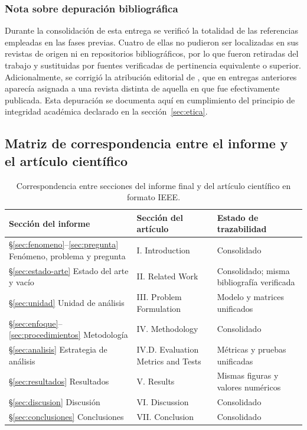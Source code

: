 \subsubsection*{Nota sobre depuración bibliográfica}

Durante la consolidación de esta entrega se verificó la totalidad de las
referencias empleadas en las fases previas. Cuatro de ellas no pudieron ser
localizadas en sus revistas de origen ni en repositorios bibliográficos, por lo
que fueron retiradas del trabajo y sustituidas por fuentes verificadas de
pertinencia equivalente o superior. Adicionalmente, se corrigió la atribución
editorial de \textcite{sepasgozar2021}, que en entregas anteriores aparecía
asignada a una revista distinta de aquella en que fue efectivamente publicada.
Esta depuración se documenta aquí en cumplimiento del principio de integridad
académica declarado en la sección~\ref{sec:etica}.

\subsection{Matriz de correspondencia entre el informe y el artículo científico}
\label{anexo:correspondencia}

\begin{table}[H]
\centering
\caption{Correspondencia entre secciones del informe final y del artículo
científico en formato IEEE.}
\label{tab:correspondencia}
\footnotesize
\begin{tabular}{@{}p{4.6cm}p{4.6cm}p{4.2cm}@{}}
\toprule
\textbf{Sección del informe} & \textbf{Sección del artículo} &
\textbf{Estado de trazabilidad}\\
\midrule
\S\ref{sec:fenomeno}--\ref{sec:pregunta} Fenómeno, problema y pregunta &
I. Introduction & Consolidado\\
\addlinespace
\S\ref{sec:estado-arte} Estado del arte y vacío &
II. Related Work & Consolidado; misma bibliografía verificada\\
\addlinespace
\S\ref{sec:unidad} Unidad de análisis &
III. Problem Formulation & Modelo y matrices unificados\\
\addlinespace
\S\ref{sec:enfoque}--\ref{sec:procedimientos} Metodología &
IV. Methodology & Consolidado\\
\addlinespace
\S\ref{sec:analisis} Estrategia de análisis &
IV.D. Evaluation Metrics and Tests & Métricas y pruebas unificadas\\
\addlinespace
\S\ref{sec:resultados} Resultados &
V. Results & Mismas figuras y valores numéricos\\
\addlinespace
\S\ref{sec:discusion} Discusión &
VI. Discussion & Consolidado\\
\addlinespace
\S\ref{sec:conclusiones} Conclusiones &
VII. Conclusion & Consolidado\\
\bottomrule
\end{tabular}
\end{table}

